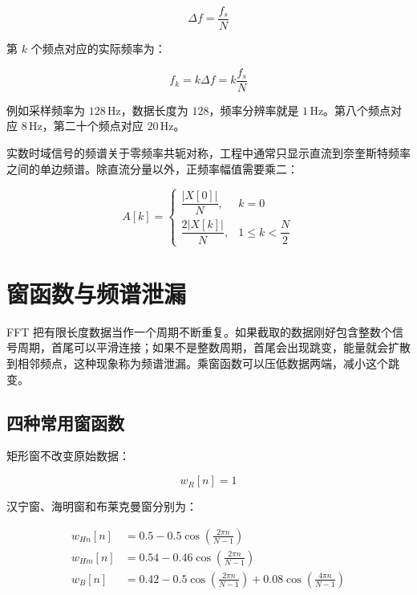 \begin{equation}
\Delta f=\frac{f_s}{N}
\label{eq:fft-resolution}
\end{equation}

第 $k$ 个频点对应的实际频率为：

\begin{equation}
f_k=k\Delta f=k\frac{f_s}{N}
\label{eq:fft-bin}
\end{equation}

例如采样频率为 $128\,\mathrm{Hz}$，数据长度为 $128$，频率分辨率就是 $1\,\mathrm{Hz}$。第八个频点对应 $8\,\mathrm{Hz}$，第二十个频点对应 $20\,\mathrm{Hz}$。

实数时域信号的频谱关于零频率共轭对称，工程中通常只显示直流到奈奎斯特频率之间的单边频谱。除直流分量以外，正频率幅值需要乘二：

\begin{equation}
A[k]=\begin{cases}
\dfrac{|X[0]|}{N}, & k=0 \\[6pt]
\dfrac{2|X[k]|}{N}, & 1\leq k<\dfrac{N}{2}
\end{cases}
\end{equation}

\section{窗函数与频谱泄漏}

FFT 把有限长度数据当作一个周期不断重复。如果截取的数据刚好包含整数个信号周期，首尾可以平滑连接；如果不是整数周期，首尾会出现跳变，能量就会扩散到相邻频点，这种现象称为频谱泄漏。乘窗函数可以压低数据两端，减小这个跳变。

\subsection{四种常用窗函数}

矩形窗不改变原始数据：

\begin{equation}
w_{R}[n]=1
\end{equation}

汉宁窗、海明窗和布莱克曼窗分别为：

\begin{align}
w_{Hn}[n] &= 0.5-0.5\cos\left(\frac{2\pi n}{N-1}\right) \\
w_{Hm}[n] &= 0.54-0.46\cos\left(\frac{2\pi n}{N-1}\right) \\
w_{B}[n] &= 0.42-0.5\cos\left(\frac{2\pi n}{N-1}\right)
            +0.08\cos\left(\frac{4\pi n}{N-1}\right)
\label{eq:fft-windows}
\end{align}

